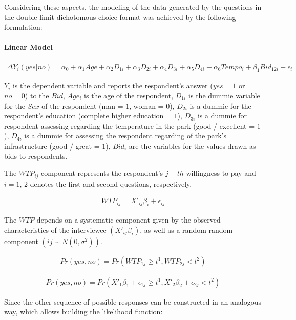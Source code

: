 \documentclass[smallextended]{svjour3}       %
\begin{document}
Considering these aspects, the modeling of the data generated by the
questions in the double limit dichotomous choice format was achieved by
the following formulation:

\hypertarget{linear-model}{%
\paragraph{Linear Model}\label{linear-model}}

\begin{align}
\Delta Y_{i}(yes|no)= \alpha_{0} + \alpha_{1}Age + \alpha_{2}D_{1i} + \alpha_{3}D_{2i} +  \alpha_{4}D_{3i} + \alpha_{5}D_{4i} + \alpha_{6}Tempo_{i} + \beta_{1}Bid_{12i} + \epsilon_{i}     
\end{align}

\(Y_i\) is the dependent variable and reports the respondent's answer
(\(yes = 1\) or \(no = 0\)) to the \(Bid\), \(Age_i\) is the age of the
respondent, \(D_{1i}\) is the dummie variable for the \(Sex\) of the
respondent (man = \(1\), woman = \(0\)), \(D_{2i}\) is a dummie for the
respondent's education (complete higher education = \(1\)), \(D_{3i}\)
is a dummie for respondent assessing regarding the temperature in the
park (good / excellent = \(1\)), \(D_{4i}\) is a dummie for assessing
the respondent regarding of the park's infrastructure (good / great =
\(1\)), \(Bid_i\) are the variables for the values drawn as bids to
respondents.

The \(WTP_{ij}\) component represents the respondent's \(j-th\)
willingness to pay and \(i = 1\), 2 denotes the first and second
questions, respectively.

\begin{align}
WTP_{ij} = X'_{ij}\beta_{i} + \epsilon_{ij}
\end{align}

The \(WTP\) depends on a systematic component given by the observed
characteristics of the interviewee \((X'_{ij}\beta_{i})\), as well as a
random random component \((ij \sim N(0, \sigma^2))\).

\begin{align}
Pr(yes, no) = Pr(WTP_{1j} \ge t^1, WTP_{2j} < t^2)
\end{align}

\begin{align}
Pr(yes, no) = Pr(X'_{1}\beta_{1} + \epsilon_{1j} \ge t^1, X'_{2}\beta_{2} + \epsilon_{2j} < t^2)
\end{align}

Since the other sequence of possible responses can be constructed in an
analogous way, which allows building the likelihood function:
\end{document}
